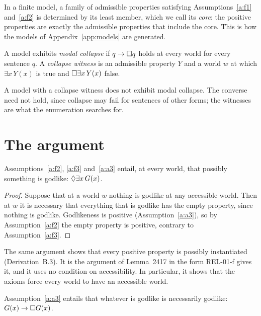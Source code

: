\documentclass{situationist-preprint}
\begin{document}
In a finite model, a family of admissible properties satisfying Assumptions~\ref{a:f1} and~\ref{a:f2} is determined by its least member, which we call its \emph{core}: the positive properties are exactly the admissible properties that include the core. This is how the models of Appendix~\ref{app:models} are generated.

\begin{definition}\label{d:collapse}
A model exhibits \emph{modal collapse} if $q \to \mathord{\Box} q$ holds at every world for every sentence $q$. A \emph{collapse witness} is an admissible property $Y$ and a world $w$ at which $\exists x\,Y(x)$ is true and $\mathord{\Box}\exists x\,Y(x)$ false.
\end{definition}

A model with a collapse witness does not exhibit modal collapse. The converse need not hold, since collapse may fail for sentences of other forms; the witnesses are what the enumeration searches for.

\section{The argument}\label{s:argument}

\begin{lemma}[Possibility]\label{l:poss}
Assumptions~\ref{a:f2}, \ref{a:f3} and~\ref{a:a3} entail, at every world, that possibly something is godlike: $\mathord{\Diamond}\exists x\,G(x)$.
\end{lemma}

\begin{proof}
Suppose that at a world $w$ nothing is godlike at any accessible world. Then at $w$ it is necessary that everything that is godlike has the empty property, since nothing is godlike. Godlikeness is positive (Assumption~\ref{a:a3}), so by Assumption~\ref{a:f2} the empty property is positive, contrary to Assumption~\ref{a:f3}.
\end{proof}

The same argument shows that every positive property is possibly instantiated (Derivation~B.3). It is the argument of Lemma~2417 in the form REL-01-f gives it, and it uses no condition on accessibility. In particular, it shows that the axioms force every world to have an accessible world.

\begin{lemma}[Rigidity]\label{l:rigid}
Assumption~\ref{a:a3} entails that whatever is godlike is necessarily godlike: $G(x) \to \mathord{\Box} G(x)$.
\end{lemma}
\end{document}
